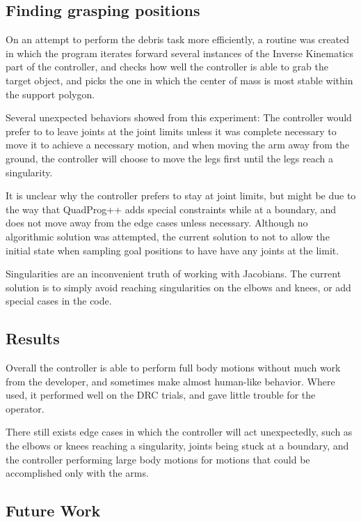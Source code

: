 \documentclass[12pt]{report}
\begin{document}
\subsection{Finding grasping positions}
On an attempt to perform the debris task more efficiently, a routine was created in which the program iterates forward several instances of the Inverse Kinematics part of the controller, and checks how well the controller is able to grab the target object, and picks the one in which the center of mass is most stable within the support polygon.

Several unexpected behaviors showed from this experiment: The controller would prefer to to leave joints at the joint limits unless it was complete necessary to move it to achieve a necessary motion, and when moving the arm away from the ground, the controller will choose to move the legs first until the legs reach a singularity. 

It is unclear why the controller prefers to stay at joint limits, but might be due to the way that QuadProg++ adds special constraints while at a boundary, and does not move away from the edge cases unless necessary. Although no algorithmic solution was attempted, the current solution to not to allow the initial state when sampling goal positions to have  have any joints at the limit.

Singularities are an inconvenient truth of working with Jacobians. The current solution is to simply avoid reaching singularities on the elbows and knees, or add special cases in the code. \cite{eric_thesis}


\subsection{Results}
Overall the controller is able to perform full body motions without much work from the developer, and sometimes make almost human-like behavior. Where used, it performed well on the DRC trials, and gave little trouble for the operator. 

There still exists edge cases in which the controller will act unexpectedly, such as the elbows or knees reaching a singularity, joints being stuck at a boundary, and the controller performing large body motions for motions that could be accomplished only with the arms. 

\subsection{Future Work}
\end{document}
